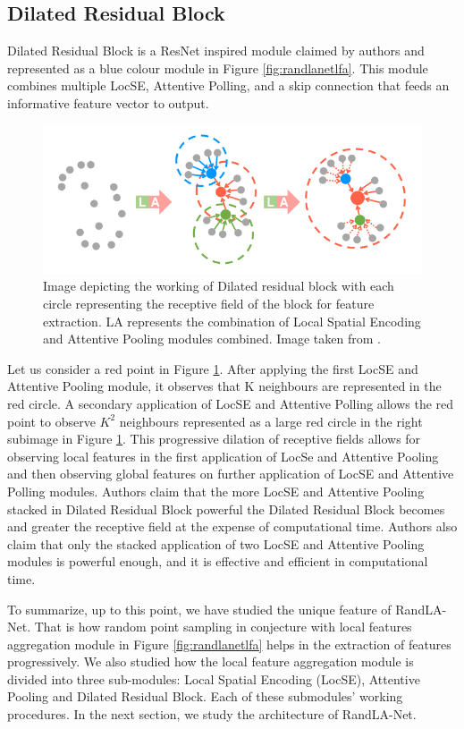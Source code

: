 \subsection{Dilated Residual Block}
Dilated Residual Block is a ResNet inspired module claimed by authors and represented as a blue colour module in Figure \ref{fig:randlanetlfa}.
This module combines multiple LocSE, Attentive Polling, and a skip connection that feeds an informative feature vector to output.
\begin{figure}
    \centering
    \includegraphics[scale=0.5]{images/dilatedresidualblock.png}
    \caption{Image depicting the working of Dilated residual block with each circle representing the receptive field of the block for feature extraction. LA represents the combination of Local Spatial Encoding and Attentive Pooling modules combined. Image taken from \cite{Hu_2020_CVPR_Randla}.}
    \label{fig:dilatedresidualblock}
\end{figure}
Let us consider a red point in Figure \ref{fig:dilatedresidualblock}. After applying the first LocSE and Attentive Pooling module, it observes that K neighbours are represented in the red circle.
A secondary application of LocSE and Attentive Polling allows the red point to observe $K^{2}$ neighbours represented as a large red circle in the right subimage in Figure \ref{fig:dilatedresidualblock}.
This progressive dilation of receptive fields allows for observing local features in the first application of LocSe and Attentive Pooling and then observing global features on further application of LocSE and Attentive Polling modules.
Authors claim that the more LocSE and Attentive Pooling stacked in Dilated Residual Block powerful the Dilated Residual Block becomes and greater the receptive field at the expense of computational time.
Authors also claim that only the stacked application of two LocSE and Attentive Pooling modules is powerful enough, and it is effective and efficient in computational time.

To summarize, up to this point, we have studied the unique feature of RandLA-Net. That is how random point sampling in conjecture with local features aggregation module in Figure \ref{fig:randlanetlfa} helps in the extraction of features progressively.
We also studied how the local feature aggregation module is divided into three sub-modules: Local Spatial Encoding (LocSE), Attentive Pooling and Dilated Residual Block. Each of these submodules' working procedures.
In the next section, we study the architecture of RandLA-Net.

